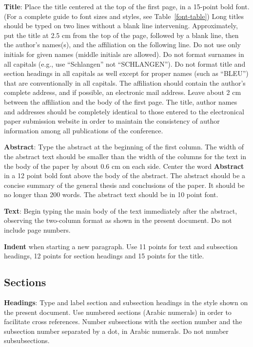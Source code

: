 \documentclass[11pt]{article}
\begin{document}
{\bf Title}: Place the title centered at the top of the first page, in
a 15-point bold font. (For a complete guide to font sizes and styles, see Table~\ref{font-table}) Long titles should be typed on two lines without
a blank line intervening. Approximately, put the title at 2.5 cm from
the top of the page, followed by a blank line, then the author's
names(s), and the affiliation on the following line. Do not use only
initials for given names (middle initials are allowed). Do not format surnames
in all capitals (e.g., use ``Schlangen'' not ``SCHLANGEN'').
Do not format title and section headings in all capitals as well
except for proper names (such as ``BLEU'') that are conventionally
in all capitals.
The affiliation should contain the author's complete address, and if
possible, an electronic mail address. Leave about 2 cm between the
affiliation and the body of the first page.
The title, author names and addresses should be completely
identical to those entered to the electronical paper submission
website in order to maintain the consistency of author information
among all publications of the conference.

{\bf Abstract}: Type the abstract at the beginning of the first
column. The width of the abstract text should be smaller than the
width of the columns for the text in the body of the paper by about
0.6 cm on each side. Center the word {\bf Abstract} in a 12 point bold
font above the body of the abstract. The abstract should be a concise
summary of the general thesis and conclusions of the paper. It should
be no longer than 200 words. The abstract text should be in 10 point font.

{\bf Text}: Begin typing the main body of the text immediately after
the abstract, observing the two-column format as shown in 
the present document. Do not include page numbers.

{\bf Indent} when starting a new paragraph. Use 11 points for text and 
subsection headings, 12 points for section headings and 15 points for
the title. 

\subsection{Sections}

{\bf Headings}: Type and label section and subsection headings in the
style shown on the present document.  Use numbered sections (Arabic
numerals) in order to facilitate cross references. Number subsections
with the section number and the subsection number separated by a dot,
in Arabic numerals. Do not number subsubsections.
\end{document}
